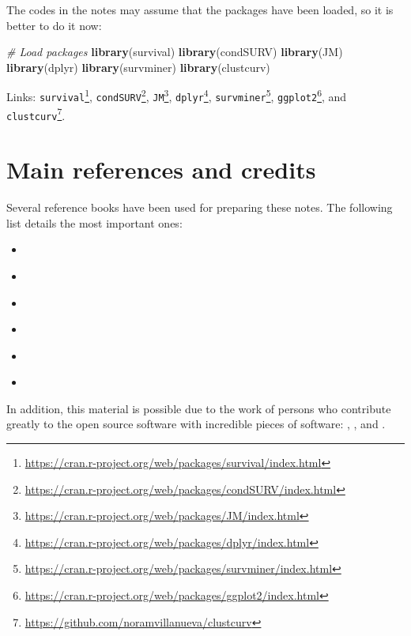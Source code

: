 \documentclass[]{book}
\makeatletter
\newenvironment{Shaded}{\begin{snugshade}}{\end{snugshade}}
\newcommand{\KeywordTok}[1]{\textcolor[rgb]{0.13,0.29,0.53}{\textbf{#1}}}
\newcommand{\CommentTok}[1]{\textcolor[rgb]{0.56,0.35,0.01}{\textit{#1}}}
\newcommand{\NormalTok}[1]{#1}
\providecommand{\tightlist}{%
  \setlength{\itemsep}{0pt}\setlength{\parskip}{0pt}}
\let\rmarkdownfootnote\footnote%
\def\footnote{\protect\rmarkdownfootnote}
\renewcommand{\href}[2]{#2\footnote{\url{#1}}}
\newenvironment{kframe}{%
\medskip{}
\setlength{\fboxsep}{.8em}
 \def\at@end@of@kframe{}%
 \ifinner\ifhmode%
  \def\at@end@of@kframe{\end{minipage}}%
  \begin{minipage}{\columnwidth}%
 \fi\fi%
 \def\FrameCommand##1{\hskip\@totalleftmargin \hskip-\fboxsep
 \colorbox{shadecolor}{##1}\hskip-\fboxsep
     \hskip-\linewidth \hskip-\@totalleftmargin \hskip\columnwidth}%
 \MakeFramed {\advance\hsize-\width
   \@totalleftmargin\z@ \linewidth\hsize
   \@setminipage}}%
 {\par\unskip\endMakeFramed%
 \at@end@of@kframe}
\renewenvironment{Shaded}{\begin{kframe}}{\end{kframe}}
\theoremstyle{definition}
\theoremstyle{definition}
\theoremstyle{definition}
\theoremstyle{remark}
\makeatother
\begin{document}
The codes in the notes may assume that the packages have been loaded, so
it is better to do it now:

\begin{Shaded}
\begin{Highlighting}[]
\CommentTok{# Load packages}
\KeywordTok{library}\NormalTok{(survival)}
\KeywordTok{library}\NormalTok{(condSURV)}
\KeywordTok{library}\NormalTok{(JM)}
\KeywordTok{library}\NormalTok{(dplyr)}
\KeywordTok{library}\NormalTok{(survminer)}
\KeywordTok{library}\NormalTok{(clustcurv)}
\end{Highlighting}
\end{Shaded}

Links:
\href{https://cran.r-project.org/web/packages/survival/index.html}{\texttt{survival}}\citep{survival-package},
\href{https://cran.r-project.org/web/packages/condSURV/index.html}{\texttt{condSURV}}\citep{condsurv_package, meiramachado-sestelo:2016},
\href{https://cran.r-project.org/web/packages/JM/index.html}{\texttt{JM}}\citep{Rizopoulos:2010aa},
\href{https://cran.r-project.org/web/packages/dplyr/index.html}{\texttt{dplyr}}\citep{Wickham:2017aa},
\href{https://cran.r-project.org/web/packages/survminer/index.html}{\texttt{survminer}}\citep{Kassambara:2017aa},
\href{https://cran.r-project.org/web/packages/ggplot2/index.html}{\texttt{ggplot2}}\citep{Wickham:2009aa},
and
\href{https://github.com/noramvillanueva/clustcurv}{\texttt{clustcurv}}.

\chapter*{Main references and
credits}\label{main-references-and-credits}

Several reference books have been used for preparing these notes. The
following list details the most important ones:

\begin{itemize}
\tightlist
\item
  \citet{kalbfleisch1980statistical}
\item
  \citet{book:1205652}
\item
  \citet{book:1129209}
\item
  \citet{book:1298616}
\item
  \citet{kleinbaum2011survival}
\item
  \citet{book:1606416}
\end{itemize}

In addition, this material is possible due to the work of persons who
contribute greatly to the open source software with incredible pieces of
software: \citet{Xie:2015aa}, \citet{Xie:2016aa}, \citet{R-rmarkdown}
and \citet{NoRefWorks:1}.
\end{document}
